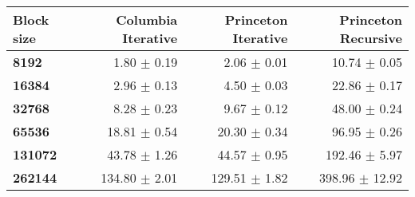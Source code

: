 \begin{tabular}{lrrr}\toprule
\textbf{Block size}  & \textbf{Columbia Iterative} & \textbf{Princeton Iterative} & \textbf{Princeton Recursive}\\\midrule
\textbf{8192}  & 1.80 $\pm$ 0.19 & 2.06 $\pm$ 0.01 & 10.74 $\pm$ 0.05\\
\textbf{16384}  & 2.96 $\pm$ 0.13 & 4.50 $\pm$ 0.03 & 22.86 $\pm$ 0.17\\
\textbf{32768}  & 8.28 $\pm$ 0.23 & 9.67 $\pm$ 0.12 & 48.00 $\pm$ 0.24\\
\textbf{65536}  & 18.81 $\pm$ 0.54 & 20.30 $\pm$ 0.34 & 96.95 $\pm$ 0.26\\
\textbf{131072}  & 43.78 $\pm$ 1.26 & 44.57 $\pm$ 0.95 & 192.46 $\pm$ 5.97\\
\textbf{262144} & 134.80 $\pm$ 2.01 & 129.51 $\pm$ 1.82 & 398.96 $\pm$ 12.92\\
\bottomrule
\end{tabular}
